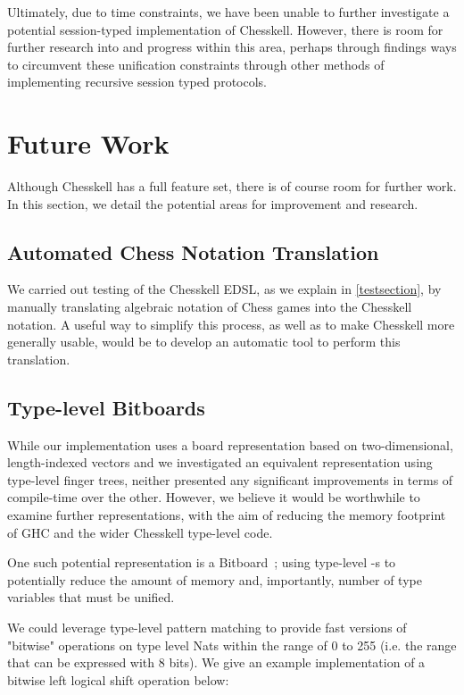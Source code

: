 Ultimately, due to time constraints, we have been unable to further investigate a potential session-typed implementation of Chesskell. However, there is room for further research into and progress within this area, perhaps through findings ways to circumvent these unification constraints through other methods of implementing recursive session typed protocols.



\section{Future Work}

Although Chesskell has a full feature set, there is of course room for further work. In this section, we detail the potential areas for improvement and research.

\subsection{Automated Chess Notation Translation}

We carried out testing of the Chesskell EDSL, as we explain in \cref{testsection}, by manually translating algebraic notation of Chess games into the Chesskell notation. A useful way to simplify this process, as well as to make Chesskell more generally usable, would be to develop an automatic tool to perform this translation.


\subsection{Type-level Bitboards} \label{bitboardconclusion}

While our implementation uses a board representation based on two-dimensional, length-indexed vectors and we investigated an equivalent representation using type-level finger trees, neither presented any significant improvements in terms of compile-time over the other. However, we believe it would be worthwhile to examine further representations, with the aim of reducing the memory footprint of GHC and the wider Chesskell type-level code.

One such potential representation is a Bitboard~\cite{bitboard}; using type-level -s to potentially reduce the amount of memory and, importantly, number of type variables that must be unified.

We could leverage type-level pattern matching to provide fast versions of "bitwise" operations on type level Nats within the range of 0 to 255 (i.e. the range that can be expressed with 8 bits). We give an example implementation of a bitwise left logical shift operation below:

